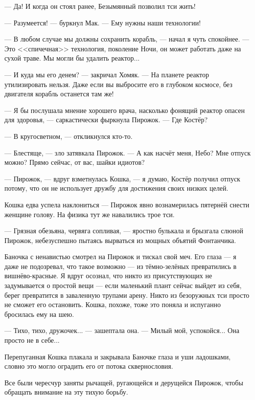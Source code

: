--- Да!
И когда он стоял ранее, Безымянный позволил тси жить!

--- Разумеется! --- буркнул Мак.
--- Ему нужны наши технологии!

--- В любом случае мы должны сохранить корабль, --- начал я чуть спокойнее.
--- Это <<спичечная>> технология, поколение Ночи, он может работать даже на сухой траве.
Мы могли бы удалить реактор...

--- И куда мы его денем? --- закричал Хомяк.
--- На планете реактор утилизировать нельзя.
Даже если вы выбросите его в глубоком космосе, без двигателя корабль останется там же!

--- Я бы послушала мнение хорошего врача, насколько фонящий реактор опасен для здоровья, --- саркастически фыркнула Пирожок.
--- Где Костёр?

--- В кругосветном, --- откликнулся кто-то.

--- Блестяще, --- зло затявкала Пирожок.
--- А как насчёт меня, Небо?
Мне отпуск можно?
Прямо сейчас, от вас, шайки идиотов?

--- Пирожок, --- вдруг взметнулась Кошка, --- я думаю, Костёр получил отпуск потому, что он не использует дружбу для достижения своих низких целей.

Кошка едва успела наклониться --- Пирожок явно вознамерилась пятернёй снести женщине голову.
На физика тут же навалились трое тси.

--- Грязная обезьяна, червяга сопливая, --- яростно булькала и брызгала слюной Пирожок, небезуспешно пытаясь вырваться из мощных объятий Фонтанчика.

Баночка с ненавистью смотрел на Пирожок и тискал свой меч.
Его глаза --- я даже не подозревал, что такое возможно --- из тёмно-зелёных превратились в вишнёво-красные.
Я вдруг осознал, что никто из присутствующих не задумывается о простой вещи --- если маленький плант сейчас выйдет из себя, берег превратится в заваленную трупами арену.
Никто из безоружных тси просто не сможет его остановить.
Кошка, похоже, тоже это поняла и испуганно бросилась ему на шею.

--- Тихо, тихо, дружочек... --- зашептала она.
--- Милый мой, успокойся...
Она просто не в себе...

Перепуганная Кошка плакала и закрывала Баночке глаза и уши ладошками, словно это могло оградить его от потока сквернословия.

Все были чересчур заняты рычащей, ругающейся и дерущейся Пирожок, чтобы обращать внимание на эту тихую борьбу.

